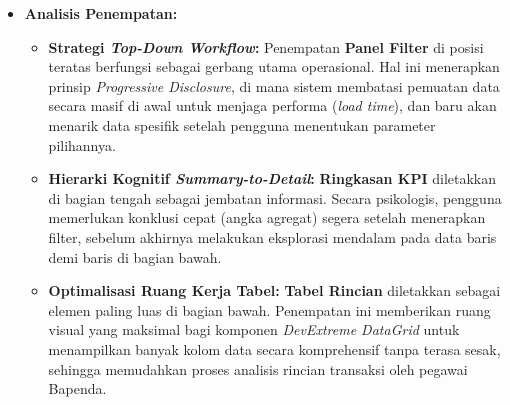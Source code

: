 \begin{itemize}
\begin{itemize}
        \item \textbf{Analisis Penempatan:}
            \begin{itemize}
                \item \textbf{Strategi \emph{Top-Down Workflow}:} Penempatan \textbf{Panel Filter} di posisi teratas berfungsi sebagai gerbang utama operasional. Hal ini menerapkan prinsip \emph{Progressive Disclosure}, di mana sistem membatasi pemuatan data secara masif di awal untuk menjaga performa (\emph{load time}), dan baru akan menarik data spesifik setelah pengguna menentukan parameter pilihannya.
                \item \textbf{Hierarki Kognitif \emph{Summary-to-Detail}:} \textbf{Ringkasan KPI} diletakkan di bagian tengah sebagai jembatan informasi. Secara psikologis, pengguna memerlukan konklusi cepat (angka agregat) segera setelah menerapkan filter, sebelum akhirnya melakukan eksplorasi mendalam pada data baris demi baris di bagian bawah.
                \item \textbf{Optimalisasi Ruang Kerja Tabel:} \textbf{Tabel Rincian} diletakkan sebagai elemen paling luas di bagian bawah. Penempatan ini memberikan ruang visual yang maksimal bagi komponen \emph{DevExtreme DataGrid} untuk menampilkan banyak kolom data secara komprehensif tanpa terasa sesak, sehingga memudahkan proses analisis rincian transaksi oleh pegawai Bapenda.
            \end{itemize}
    \end{itemize}


\end{itemize}
